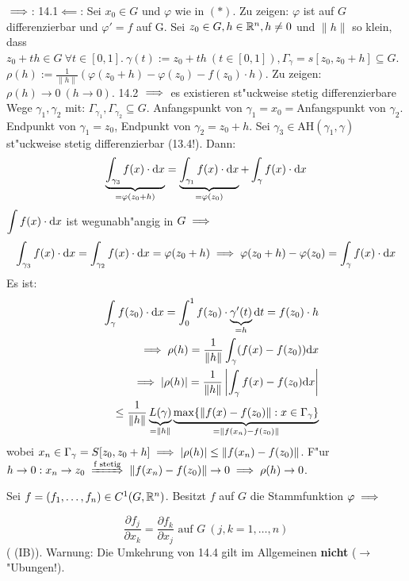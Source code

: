 \documentclass[a4paper,twoside,DIV15,BCOR12mm,chapterprefix=true,headings=twolinechapter]{scrbook}
\begin{document}
\begin{beweis}
\glqq$\implies$\grqq: 14.1\quad \glqq$\impliedby$\grqq: Sei $x_0\in G$ und $\varphi$ wie in $(*)$. Zu zeigen: $\varphi$ ist auf $G$ differenzierbar und $\varphi'=f$ auf G. Sei $z_0\in G, h\in\mathbb{R}^n,h\ne 0$ und $\|h\|$ so klein, dass $z_0+th\in G\ \forall t\in[0,1].\ \gamma(t):=z_0+th\ (t\in[0,1]), \Gamma_\gamma=s[z_0, z_0+h]\subseteq G$. $\rho(h):=\frac{1}{\|h\|}(\varphi(z_0+h)-\varphi(z_0)-f(z_0)\cdot h)$. Zu zeigen: $\rho(h)\to 0\ (h\to 0)$. 14.2 $\implies$ es existieren st"uckweise stetig differenzierbare Wege $\gamma_1, \gamma_2$ mit: $\Gamma_{\gamma_1},\Gamma_{\gamma_2}\subseteq G$. Anfangspunkt von $\gamma_1=x_0=$Anfangspunkt von $\gamma_2$. Endpunkt von $\gamma_1=z_0$, Endpunkt von $\gamma_2=z_0+h$. Sei $\gamma_3\in \text{AH}(\gamma_1,\gamma)$ st"uckweise stetig differenzierbar (13.4!). Dann: 
$$\underbrace{\displaystyle\int_{\gamma_3}f(x)\cdot\text{d}x}_{=\varphi(z_0+h)}=\underbrace{\displaystyle\int_{\gamma_1}f(x)\cdot\text{d}x}_{=\varphi(z_0)}+\displaystyle\int_{\gamma}f(x)\cdot\text{d}x$$
$\displaystyle\int f(x)\cdot\text{d}x$ ist wegunabh"angig in $G\implies$\\
$$\displaystyle\int_{\gamma_3}f(x)\cdot\text{d}x=\displaystyle\int_{\gamma_2}f(x)\cdot\text{d}x=\varphi(z_0+h)\implies\varphi(z_0+h)-\varphi(z_0)=\displaystyle\int_{\gamma}f(x)\cdot\text{d}x$$
Es ist:
\begin{eqnarray*}
&&\displaystyle\int_{\gamma}f(z_0)\cdot\text{d}x=\displaystyle\int_0^1 f(z_0)\cdot\underbrace{\gamma'(t)}_{=h}\text{d}t=f(z_0)\cdot h\\
&&\implies \rho(h)=\frac{1}{\|h\|}\displaystyle\int_{\gamma}(f(x)-f(z_0))\text{d}x\\
&&\implies |\rho(h)|=\frac{1}{\|h\|}\left|\displaystyle\int_{\gamma}f(x)-f(z_0)\text{d}x\right|\\
&&\le\frac{1}{\|h\|}\underbrace{L(\gamma)}_{=\|h\|}\underbrace{\max\{\|f(x)-f(z_0)\|: x\in\Gamma_\gamma\}}_{=\|f(x_n)-f(z_0)\|}
\end{eqnarray*}
wobei $x_n\in\Gamma_\gamma=S[z_0,z_0+h]\implies |\rho(h)|\le\|f(x_n)-f(z_0)\|$. F"ur $h\to 0: x_n\to z_0\folgtnach{f stetig}\|f(x_n)-f(z_0)\|\to 0\folgt\rho(h)\to 0$.
\end{beweis}

\begin{satz}[Integrabilitätsbedingungen]
Sei $f=(f_1,\ldots, f_n)\in C^1(G,\mathbb{R}^n)$. Besitzt $f$ auf $G$ die Stammfunktion $\varphi\implies$

$$\frac{\partial f_j}{\partial x_k}=\frac{\partial f_k}{\partial x_j}\text{ auf }G\ (j,k=1,\ldots,n)$$
( (IB)). Warnung: Die Umkehrung von 14.4 gilt im Allgemeinen \textbf{nicht} ($\to$ "Ubungen!).
\end{satz}
\end{document}
